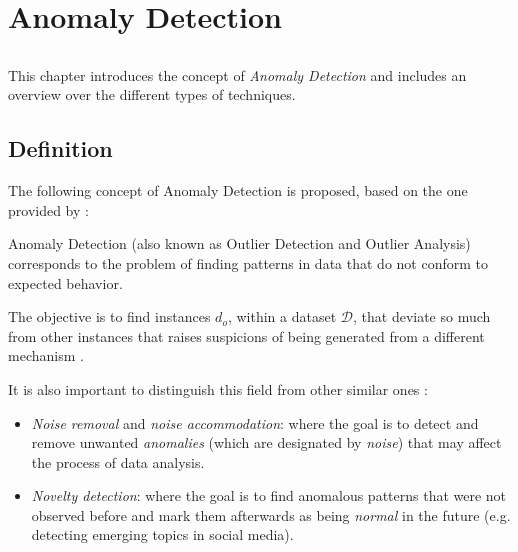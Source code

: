 \chapter{Anomaly Detection} \label{chap:anomaly}

\section*{}

This chapter introduces the concept of \textit{Anomaly Detection} and includes an overview over the different types of techniques.

\section{Definition}

The following concept of Anomaly Detection is proposed, based on the one provided by \textcite{Kandhari2009}:

\begin{definition}
	Anomaly Detection (also known as Outlier Detection and Outlier Analysis) corresponds to the problem of finding patterns in data that do not conform to expected behavior.
\end{definition}

The objective is to find instances $d_o$, within a dataset $\mathcal{D}$, that deviate so much from other instances that raises suspicions of being generated from a different mechanism \cite{hawkins1980identification}.

It is also important to distinguish this field from other similar ones \cite{Kandhari2009}:
\begin{itemize}
	\item \textit{Noise removal} and \textit{noise accommodation}: where the goal is to detect and remove unwanted \textit{anomalies} (which are designated by \textit{noise}) that may affect the process of data analysis.
	
	\item \textit{Novelty detection}: where the goal is to find anomalous patterns that were not observed before and mark them afterwards as being \textit{normal} in the future (e.g. detecting emerging topics in social media).
\end{itemize}


